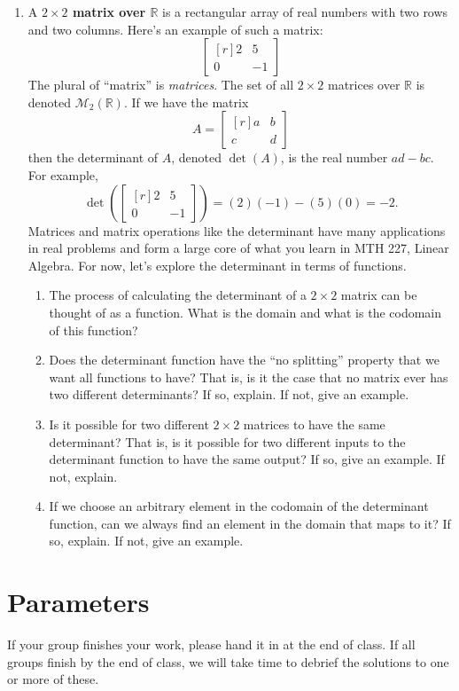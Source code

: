 \documentclass[11pt]{article}
\begin{document}
\begin{enumerate}
	\item A \textbf{$2 \times 2$ matrix over $\mathbb{R}$} is a rectangular array of real numbers with two rows and two columns. Here's an example of such a matrix: 
	\[ \begin{bmatrix*}[r]
		2 & 5 \\
		0 & -1
	\end{bmatrix*} \]
The plural of ``matrix'' is \emph{matrices}. 
The set of all $2 \times 2$ matrices over $\mathbb{R}$ is denoted $\mathcal{M}_2(\mathbb{R})$. If we have the matrix 
\[ A = \begin{bmatrix*}[r]
	a & b \\ c & d 
\end{bmatrix*}\]
then the determinant of $A$, denoted $\det(A)$, is the real number $ad - bc$. For example, 
\[ \det\left( \begin{bmatrix*}[r]
	2 & 5 \\
	0 & -1
\end{bmatrix*} \right) = (2)(-1) - (5)(0) = -2.
\]	
Matrices and matrix operations like the determinant have many applications in real problems and form a large core of what you learn in MTH 227, Linear Algebra. For now, let's explore the determinant in terms of functions. 
	\begin{enumerate}
		\item The process of calculating the determinant of a $2 \times 2$ matrix can be thought of as a function. What is the domain and what is the codomain of this function? 
		\item Does the determinant function have the ``no splitting'' property that we want all functions to have? That is, is it the case that no matrix ever has two different determinants? If so, explain. If not, give an example. 
		\item Is it possible for two different $2 \times 2$ matrices to have the same determinant? That is, is it possible for two different inputs to the determinant function to have the same output? If so, give an example. If not, explain. 
		\item If we choose an arbitrary element in the codomain of the determinant function, can we always find an element in the domain that maps to it? If so, explain. If not, give an example. 
	\end{enumerate}
\end{enumerate}

\section*{Parameters}

If your group finishes your work, please hand it in at the end of class. If all groups finish by the end of class, we will take time to debrief the solutions to one or more of these. 
\end{document}
